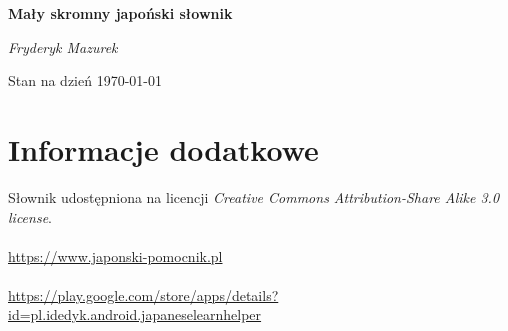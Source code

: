 \documentclass[10pt,a4paper,twoside,titlepage]{report} %
\begin{document}
\begin{titlepage}
	\centering
	\vspace*{6.5cm}
	{\huge\bfseries Mały skromny japoński słownik\par}
	\vspace{2cm}
	{\Large\itshape Fryderyk Mazurek\par}
	
	\vfill

	{\large Stan na dzień \today\par}
\end{titlepage}



\newpage
\section*{Informacje dodatkowe}
\markboth{}{}

\noindent Słownik udostępniona na licencji \textit{Creative Commons Attribution-Share Alike 3.0 license}. \\ \\
\noindent \url{https://www.japonski-pomocnik.pl} \\ \\
\noindent \url{https://play.google.com/store/apps/details?id=pl.idedyk.android.japaneselearnhelper}

\end{document}
